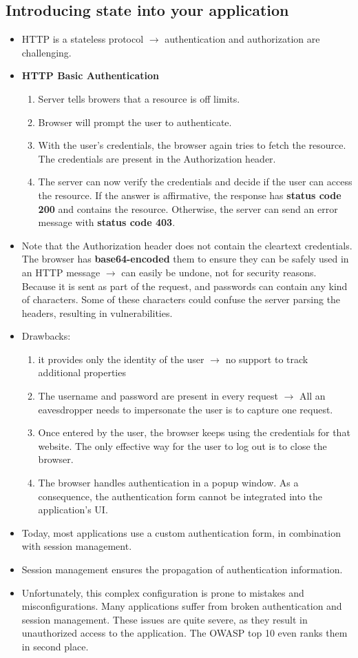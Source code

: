 \documentclass[../main.tex]{subfiles}
\begin{document}
\subsection{Introducing state into your application}
\begin{itemize}
\item HTTP is a stateless protocol $\rightarrow$ authentication and authorization are challenging.
\item \textbf{HTTP Basic Authentication}
\begin{enumerate}
\item Server tells browers that a resource is off limits.
\item Browser will prompt the user to authenticate.
\item With the user's credentials, the browser again tries to fetch the resource. The credentials are present in the Authorization header.
\item The server can now verify the credentials and decide if the user can access the resource. If the answer is affirmative, the response has \textbf{status code 200} and contains the resource. Otherwise, the server can send an error message with \textbf{status code 403}.
\end{enumerate}
\item Note that the Authorization header does not contain the cleartext credentials. The browser has \textbf{base64-encoded} them to ensure they can be safely used in an HTTP message $\rightarrow$ can easily be undone, not for security reasons. Because it is sent as part of the request, and passwords can contain any kind of characters. Some of these characters could confuse the server parsing the headers, resulting in vulnerabilities.
\item Drawbacks:
\begin{enumerate}
\item it provides only the identity of the user $\rightarrow$ no support to track additional properties
\item The username and password are present in every request $\rightarrow$ All an eavesdropper needs to impersonate the user is to capture one request.
\item Once entered by the user, the browser keeps using the credentials for that website. The only effective way for the user to log out is to close the browser.
\item The browser handles authentication in a popup window. As a consequence, the authentication form cannot be integrated into the application's UI.
\end{enumerate}
\item Today, most applications use a custom authentication form, in combination with session management.
\item Session management ensures the propagation of authentication information.
\item Unfortunately, this complex configuration is prone to mistakes and misconfigurations. Many applications suffer from broken authentication and session management. These issues are quite severe, as they result in unauthorized access to the application. The OWASP top 10 even ranks them in second place.
\end{itemize}
\end{document}
